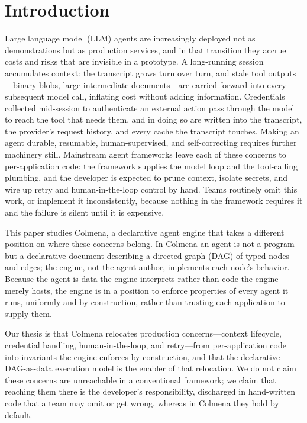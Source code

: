 \section{Introduction}
\label{sec:intro}

Large language model (LLM) agents are increasingly deployed not as
demonstrations but as production services, and in that transition they accrue
costs and risks that are invisible in a prototype. A long-running session
accumulates context: the transcript grows turn over turn, and stale tool
outputs---binary blobs, large intermediate documents---are carried forward
into every subsequent model call, inflating cost without adding information.
Credentials collected mid-session to authenticate an external action pass
through the model to reach the tool that needs them, and in doing so are
written into the transcript, the provider's request history, and every cache
the transcript touches. Making an agent durable, resumable, human-supervised,
and self-correcting requires further machinery still. Mainstream agent
frameworks leave each of these concerns to per-application code: the framework
supplies the model loop and the tool-calling plumbing, and the developer is
expected to prune context, isolate secrets, and wire up retry and
human-in-the-loop control by hand. Teams routinely omit this work, or
implement it inconsistently, because nothing in the framework requires it and
the failure is silent until it is expensive.

This paper studies Colmena, a declarative agent engine that takes a different
position on where these concerns belong. In Colmena an agent is not a program
but a declarative document describing a directed graph (DAG) of typed
nodes and edges; the engine, not the agent author, implements each node's
behavior. Because the agent is data the engine interprets rather than code the
engine merely hosts, the engine is in a position to enforce properties of every
agent it runs, uniformly and by construction, rather than trusting each
application to supply them.

Our thesis is that Colmena relocates production concerns---context lifecycle,
credential handling, human-in-the-loop, and retry---from per-application code
into invariants the engine enforces by construction, and that the declarative
DAG-as-data execution model is the enabler of that relocation. We do not claim
these concerns are unreachable in a conventional framework; we claim that
reaching them there is the developer's responsibility, discharged in
hand-written code that a team may omit or get wrong, whereas in Colmena they
hold by default.


